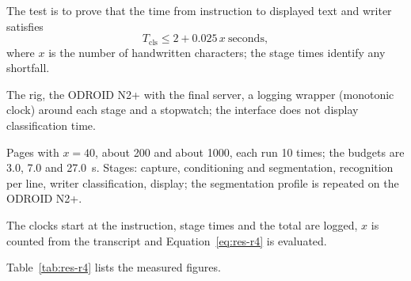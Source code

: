 
\medskip
\label{sec:res-qtp4}


            The test is to prove that the time from instruction to displayed text and writer satisfies
            \begin{equation}
            \label{eq:res-r4}
            T_{\mathrm{cls}}\le 2+0.025\,x\ \text{seconds},
            \end{equation}
            where $x$ is the number of handwritten characters; the stage times identify any shortfall.


            The rig, the ODROID N2+ with the final server, a logging wrapper (monotonic clock) around each stage and a stopwatch; the interface does not display classification time.


            Pages with $x=40$, about 200 and about 1000, each run 10 times; the budgets are 3.0, 7.0 and 27.0~s.
            Stages: capture, conditioning and segmentation, recognition per line, writer classification, display; the segmentation profile is repeated on the ODROID N2+.


            The clocks start at the instruction, stage times and the total are logged, $x$ is counted from the transcript and Equation~\ref{eq:res-r4} is evaluated.


            Table~\ref{tab:res-r4} lists the measured figures.

